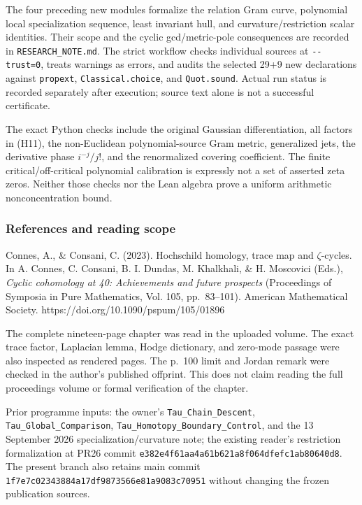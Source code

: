 The four preceding new modules formalize the relation Gram curve, polynomial local specialization sequence, least invariant hull, and curvature/restriction scalar identities. Their scope and the cyclic gcd/metric-pole consequences are recorded in \nolinkurl{RESEARCH_NOTE.md}. The strict workflow checks individual sources at \texttt{-\/-trust=0}, treats warnings as errors, and audits the selected 29+9 new declarations against \nolinkurl{propext}, \nolinkurl{Classical.choice}, and \nolinkurl{Quot.sound}. Actual run status is recorded separately after execution; source text alone is not a successful certificate.

The exact Python checks include the original Gaussian differentiation, all factors in (H11), the non-Euclidean polynomial-source Gram metric, generalized jets, the derivative phase \(i^{-j}/j!\), and the renormalized covering coefficient. The finite critical/off-critical polynomial calibration is expressly not a set of asserted zeta zeros. Neither those checks nor the Lean algebra prove a uniform arithmetic nonconcentration bound.

\subsubsection{References and reading scope}\label{endpoint-cc_hochschild--references-and-reading-scope}

Connes, A., \& Consani, C. (2023). Hochschild homology, trace map and \(\zeta\)-cycles. In A. Connes, C. Consani, B. I. Dundas, M. Khalkhali, \& H. Moscovici (Eds.), \emph{Cyclic cohomology at 40: Achievements and future prospects} (Proceedings of Symposia in Pure Mathematics, Vol. 105, pp.~83--101). American Mathematical Society. https://doi.org/10.1090/pspum/105/01896

The complete nineteen-page chapter was read in the uploaded volume. The exact trace factor, Laplacian lemma, Hodge dictionary, and zero-mode passage were also inspected as rendered pages. The p.~100 limit and Jordan remark were checked in the author's published offprint. This does not claim reading the full proceedings volume or formal verification of the chapter.

Prior programme inputs: the owner's \nolinkurl{Tau_Chain_Descent}, \nolinkurl{Tau_Global_Comparison}, \nolinkurl{Tau_Homotopy_Boundary_Control}, and the 13 September 2026 specialization/curvature note; the existing reader's restriction formalization at PR26 commit \nolinkurl{e382e4f61aa4a61b621a8f064dfefc1ab80640d8}. The present branch also retains main commit \nolinkurl{1f7e7c02343884a17df9873566e81a9083c70951} without changing the frozen publication sources.
